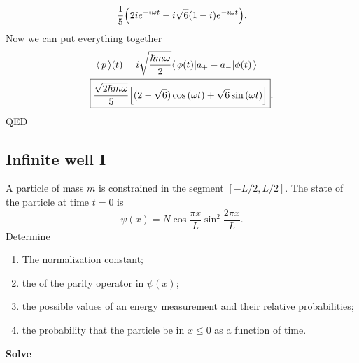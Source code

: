 \begin{description}
\begin{enumerate}[(a)]
\begin{gather}
            \frac{1}{5} \Bigl( 2i e^{-i \omega t} - i \sqrt{6} (1-i) e^{-i \omega t} \Bigr) \label{eq: am_phi_time}.
        \end{gather}
        Now we can put everything together
        \begin{gather}
            \langle \, p \, \rangle(t) = i \sqrt{\frac{\hbar m \omega}{2}} \langle \, \phi(t) | a_+ - a_- | \phi(t) \, \rangle = \notag \\
            \boxed{\frac{\sqrt{2 \hbar m \omega}}{5} \Bigl[ (2 - \sqrt{6}) \cos \,(\omega t) + \sqrt{6} \sin \, ( \omega t ) \Bigr]}.
        \end{gather}
        QED
    \end{enumerate}    
\end{description}
\subsection{Infinite well I}
A particle of mass $m$ is constrained in the segment $[-L/2, L/2]$. The state of the particle at time $t=0$ is 
\begin{equation}
    \psi(x) = N \cos \frac{\pi x}{L} \sin^2 \frac{2 \pi x}{L}.
\end{equation}
Determine
\begin{enumerate}
    \item The normalization constant;
    \item the \epv of the parity operator in $\psi(x)$;
    \item the possible values of an energy measurement and their relative probabilities;
    \item the probability that the particle be in $x \le 0$ as a function of time.
\end{enumerate}

\textbf{Solve}

